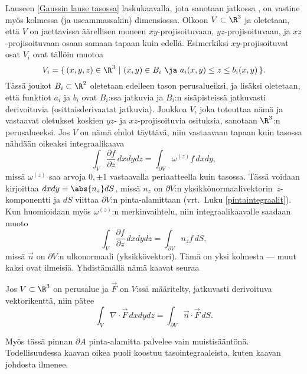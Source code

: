 Lauseen \ref{Gaussin lause tasossa} laskukaavalla, jota sanotaan jatkossa
, on vastine myös kolmessa (ja useammassakin) dimensiossa. Olkoon
$V\subset\R^3$ ja oletetaan, että $V$ on jaettavissa äärellisen moneen $xy$-projisoituvaan,
$yz$-projisoituvaan, ja $xz$-projisoituvaan osaan samaan tapaan kuin edellä. Esimerkiksi
$xy$-projisoituvat osat $V_i$ ovat tällöin muotoa
\[ 
V_i = \{\,(x,y,z) \in \R^3\ | \ (x,y) \in B_i\ \ja\ a_i(x,y) \le z \le b_i(x,y)\,\}. 
\]
Tässä joukot $B_i \subset \R^2$ oletetaan edelleen tason perusalueiksi, ja lisäksi oletetaan,
että funktiot $a_i$ ja $b_i$ ovat $B_i$:ssa jatkuvia ja $B_i$:n sisäpisteissä jatkuvasti 
derivoituvia (osittaisderivaatat jatkuvia). Joukkoa $V$, joka toteuttaa nämä ja vastaavat
oletukset koskien $yz$- ja $xz$-projisoituvia osituksia, sanotaan $\R^3$:n perusalueeksi. Jos
$V$ on nämä ehdot täyttävä, niin vastaavaan tapaan kuin tasossa nähdään oikeaksi
integraalikaava
\[
\int_V \frac{\partial f}{\partial z}\,dxdydz = \int_{\partial V} \omega^{(z)} f\,dxdy,
\]
missä $\omega^{(z)}$ saa arvoja $0,\pm 1$ vastaavalla periaatteella kuin tasossa. Tässä
voidaan kirjoittaa $dxdy=\abs{n_z}dS$, missä $n_z$ on $\partial V$:n yksikkönormaalivektorin
$\,z$-komponentti ja $dS$ viittaa $\partial V$:n pinta-alamittaan 
(vrt.\ Luku \ref{pintaintegraalit}). Kun huomioidaan myös $\omega^{(z)}$:n merkinvaihtelu,
niin integraalikaavalle saadaan muoto
\[
\int_V \frac{\partial f}{\partial z}\,dxdydz = \int_{\partial V} n_z f\,dS,
\]
missä $\vec n$ on $\partial V$:n ulkonormaali (yksikkövektori). Tämä on yksi kolmesta
%
 --- muut kaksi ovat ilmeisiä. Yhdistämällä nämä kaavat seuraa
\begin{Lause}  \label{Gaussin lause avaruudessa}
 Jos $V\subset\R^3$ on perusalue ja
$\vec F$ on $V$:ssä määritelty, jatkuvasti derivoituva vektorikenttä, niin pätee
\[
\boxed{\quad \int_V \nabla\cdot\vec F\,dxdydz
                    =\int_{\partial V} \vec n\cdot\vec F\,dS. \quad}
\]
\end{Lause}
Myös tässä  pinnan $\partial A$ pinta-alamitta palvelee vain
muistisääntönä. Todellisuudessa kaavan oikea puoli koostuu tasointegraaleista, kuten kaavan
johdosta ilmenee.

